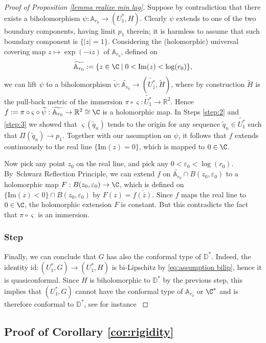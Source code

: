 \documentclass[JEP,XML,SOM,Unicode,NoEqCountersInSection,published]{cedram}
\let\epsilon\varepsilon
\newcounter{steps}
\newcommand{\step}{\refstepcounter{steps}\subsubsection*{Step \thesteps}}
\theoremstyle{definition}
\newcommand{\R}{{\mathbb R}}
\begin{document}
\begin{proof}[Proof of Proposition \ref{lemma realize min lag}]
Suppose by contradiction that there exists a biholomorphism $\psi:\mathbb A_{r_0}\to (U_1^*,H)$. Clearly $\psi$ extends to one of the two boundary components, having limit $p_1$ therein; it is harmless to assume that such boundary component is $\{|z|=1\}$. Considering the (holomorphic) universal covering map $z\mapsto \exp({-iz})$ of $\mathbb A_{r_0}$, defined on
\begin{equation}\label{eq:univ cover annulus}
\widetilde{\mathbb A_{r_0}}:=\{z\in\C\mid0<\mathrm{Im}(z)<\log(r_0)\},
\end{equation}
we can lift $\psi$ to a biholomorphism $\widetilde\psi:\widetilde{\mathbb A_{r_0}}\to (\widetilde{U_1^*},\widetilde H)$, where by construction $\widetilde H$ is the pull-back metric of the immersion $\pi\circ\varsigma:\widetilde{U_1^*}\to\R^2$. Hence $f:=\pi\circ\varsigma\circ\widetilde\psi:\widetilde{\mathbb A_{r_0}}\to\R^2\cong \C$ is a holomorphic map. In Steps \ref{step:2} and \ref{step:3} we showed that $\varsigma(\widetilde q_n)$ tends to the origin for any sequence $\widetilde q_n\in \widetilde{U_1^*}$ such that $\Pi(\widetilde q_n)\to p_1$. Together with our assumption on $\psi$, it follows that $f$ extends continuously to the real line $\{\mathrm{Im}(z)=0\}$, which is mapped to $0\in\C$.

Now pick any point $z_0$ on the real line, and pick any $0<\epsilon_0<\log(r_0)$. By~Schwarz Reflection Principle, we can extend $f$ on $\widetilde{\mathbb A_{r_0}}\cap B(z_0,\epsilon_0)$ to a holomorphic map \hbox{$F:B(z_0,\epsilon_0)\to\C$}, which is defined on $\{\mathrm{Im}(z)<0\}\cap B(z_0,\epsilon_0)$ by $F(z)=\overline{f(\overline z)}$. Since $f$ maps the real line to $0\in \C$, the holomorphic extension $F$ is constant. But this contradicts the fact that $\pi\circ\varsigma$ is an immersion.

\step\label{step:6}
Finally, we can conclude that $G$ has also the conformal type of $\mathbb D^*$. Indeed, the identity $\mathrm{id}:(U_1^*,G)\to (U_1^*,H)$ is bi-Lipschitz by \eqref{eq:assumption bilip}, hence it is quasiconformal. Since $H$ is biholomorphic to $\mathbb D^*$ by the previous step, this implies that $(U_1^*,G)$ cannot have the conformal type of $\mathbb A_{r_0}$ or $\C^*$ and is therefore conformal to $\mathbb D^*$, see for instance \cite[\S 4.3]{zbMATH05042912}
\end{proof}

\subsection{Proof of Corollary \ref{cor:rigidity}}
\end{document}
